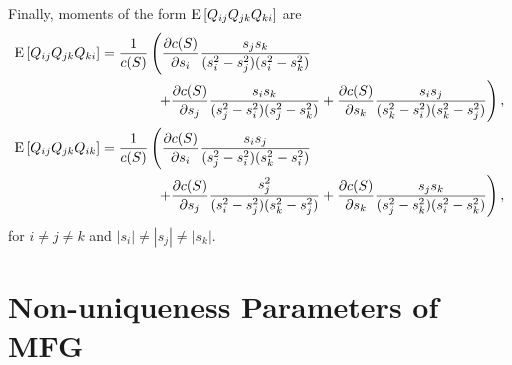 Finally, moments of the form $\mathrm{E}\left[ Q_{ij}Q_{jk}Q_{ki} \right]$ are
\begin{subequations}
	\begin{align}
		\mathrm{E}\left[ Q_{ij}Q_{jk}Q_{ki} \right] &= \frac{1}{c(S)}\left( \frac{\partial c(S)}{\partial s_i} \frac{s_js_k}{(s_i^2-s_j^2)(s_i^2-s_k^2)} \right. \nonumber \\
		&\qquad\qquad \left. + \frac{\partial c(S)}{\partial s_j} \frac{s_is_k}{(s_j^2-s_i^2)(s_j^2-s_k^2)} + \frac{\partial c(S)}{\partial s_k} \frac{s_is_j}{(s_k^2-s_i^2)(s_k^2-s_j^2)} \right), \\
		\mathrm{E}\left[ Q_{ij}Q_{jk}Q_{ik} \right] &= \frac{1}{c(S)}\left( \frac{\partial c(S)}{\partial s_i} \frac{s_is_j}{(s_j^2-s_i^2)(s_k^2-s_i^2)} \right. \nonumber \\
		&\qquad\qquad \left. + \frac{\partial c(S)}{\partial s_j} \frac{s_j^2}{(s_i^2-s_j^2)(s_k^2-s_j^2)} + \frac{\partial c(S)}{\partial s_k} \frac{s_js_k}{(s_j^2-s_k^2)(s_i^2-s_k^2)} \right),
	\end{align}
\end{subequations}
for $i\neq j\neq k$ and $|s_i|\neq |s_j| \neq |s_k|$.

\chapter{Non-uniqueness Parameters of MFG} \label{app:MFG-unique}

